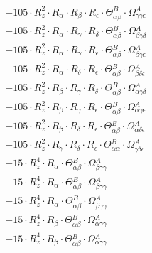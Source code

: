 \documentclass{article}
\begin{document}
\begin{subequations}
\begin{gather}
\begin{array}{c}
 \\[0.2em] 		 + 105 \cdot R_{z}^{2} \cdot R_{\alpha{}} \cdot R_{\beta{}} \cdot R_{\epsilon{}} \cdot \Theta{}^{B}_{\alpha{}\beta{}} \cdot \Omega{}^{A}_{\gamma{}\gamma{}\epsilon{}} 
 \\[0.2em] 		 + 105 \cdot R_{z}^{2} \cdot R_{\alpha{}} \cdot R_{\gamma{}} \cdot R_{\delta{}} \cdot \Theta{}^{B}_{\alpha{}\beta{}} \cdot \Omega{}^{A}_{\beta{}\gamma{}\delta{}} 
 \\[0.2em] 		 + 105 \cdot R_{z}^{2} \cdot R_{\alpha{}} \cdot R_{\gamma{}} \cdot R_{\epsilon{}} \cdot \Theta{}^{B}_{\alpha{}\beta{}} \cdot \Omega{}^{A}_{\beta{}\gamma{}\epsilon{}} 
 \\[0.2em] 		 + 105 \cdot R_{z}^{2} \cdot R_{\alpha{}} \cdot R_{\delta{}} \cdot R_{\epsilon{}} \cdot \Theta{}^{B}_{\alpha{}\beta{}} \cdot \Omega{}^{A}_{\beta{}\delta{}\epsilon{}} 
 \\[0.2em] 		 + 105 \cdot R_{z}^{2} \cdot R_{\beta{}} \cdot R_{\gamma{}} \cdot R_{\delta{}} \cdot \Theta{}^{B}_{\alpha{}\beta{}} \cdot \Omega{}^{A}_{\alpha{}\gamma{}\delta{}} 
 \\[0.2em] 		 + 105 \cdot R_{z}^{2} \cdot R_{\beta{}} \cdot R_{\gamma{}} \cdot R_{\epsilon{}} \cdot \Theta{}^{B}_{\alpha{}\beta{}} \cdot \Omega{}^{A}_{\alpha{}\gamma{}\epsilon{}} 
 \\[0.2em] 		 + 105 \cdot R_{z}^{2} \cdot R_{\beta{}} \cdot R_{\delta{}} \cdot R_{\epsilon{}} \cdot \Theta{}^{B}_{\alpha{}\beta{}} \cdot \Omega{}^{A}_{\alpha{}\delta{}\epsilon{}} 
 \\[0.2em] 		 + 105 \cdot R_{z}^{2} \cdot R_{\gamma{}} \cdot R_{\delta{}} \cdot R_{\epsilon{}} \cdot \Theta{}^{B}_{\alpha{}\alpha{}} \cdot \Omega{}^{A}_{\gamma{}\delta{}\epsilon{}} 
 \\[0.2em] 		 - 15 \cdot R_{z}^{4} \cdot R_{\alpha{}} \cdot \Theta{}^{B}_{\alpha{}\beta{}} \cdot \Omega{}^{A}_{\beta{}\gamma{}\gamma{}} 
 \\[0.2em] 		 - 15 \cdot R_{z}^{4} \cdot R_{\alpha{}} \cdot \Theta{}^{B}_{\alpha{}\beta{}} \cdot \Omega{}^{A}_{\beta{}\gamma{}\gamma{}} 
 \\[0.2em] 		 - 15 \cdot R_{z}^{4} \cdot R_{\alpha{}} \cdot \Theta{}^{B}_{\alpha{}\beta{}} \cdot \Omega{}^{A}_{\beta{}\gamma{}\gamma{}} 
 \\[0.2em] 		 - 15 \cdot R_{z}^{4} \cdot R_{\beta{}} \cdot \Theta{}^{B}_{\alpha{}\beta{}} \cdot \Omega{}^{A}_{\alpha{}\gamma{}\gamma{}} 
 \\[0.2em] 		 - 15 \cdot R_{z}^{4} \cdot R_{\beta{}} \cdot \Theta{}^{B}_{\alpha{}\beta{}} \cdot \Omega{}^{A}_{\alpha{}\gamma{}\gamma{}} 

\end{array}
\end{gather}
\end{subequations}
\end{document}
